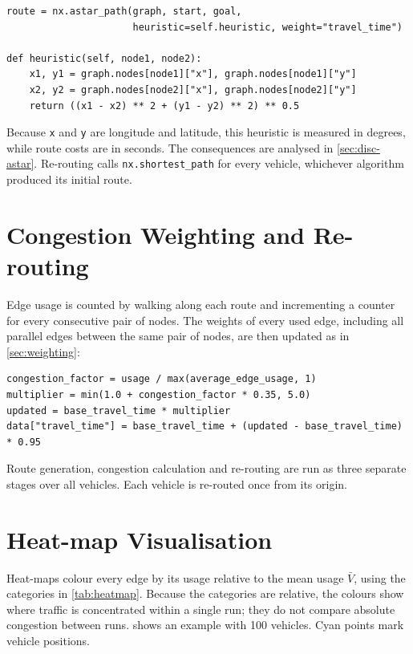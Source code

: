 \documentclass[12pt]{report}
\newcommand{\code}[1]{\texttt{#1}}
\begin{document}
\begin{lstlisting}
route = nx.astar_path(graph, start, goal,
                      heuristic=self.heuristic, weight="travel_time")

def heuristic(self, node1, node2):
    x1, y1 = graph.nodes[node1]["x"], graph.nodes[node1]["y"]
    x2, y2 = graph.nodes[node2]["x"], graph.nodes[node2]["y"]
    return ((x1 - x2) ** 2 + (y1 - y2) ** 2) ** 0.5
\end{lstlisting}

Because \code{x} and \code{y} are longitude and latitude, this heuristic is measured in degrees, while route costs are in seconds. The consequences are analysed in \cref{sec:disc-astar}. Re-routing calls \code{nx.shortest\_path} for every vehicle, whichever algorithm produced its initial route.

\section{Congestion Weighting and Re-routing}

Edge usage is counted by walking along each route and incrementing a counter for every consecutive pair of nodes. The weights of every used edge, including all parallel edges between the same pair of nodes, are then updated as in \cref{sec:weighting}:

\begin{lstlisting}
congestion_factor = usage / max(average_edge_usage, 1)
multiplier = min(1.0 + congestion_factor * 0.35, 5.0)
updated = base_travel_time * multiplier
data["travel_time"] = base_travel_time + (updated - base_travel_time) * 0.95
\end{lstlisting}

Route generation, congestion calculation and re-routing are run as three separate stages over all vehicles. Each vehicle is re-routed once from its origin.

\section{Heat-map Visualisation}

Heat-maps colour every edge by its usage relative to the mean usage $\bar{V}$, using the categories in \cref{tab:heatmap}. Because the categories are relative, the colours show where traffic is concentrated within a single run; they do not compare absolute congestion between runs.  shows an example with 100 vehicles. Cyan points mark vehicle positions.
\end{document}
